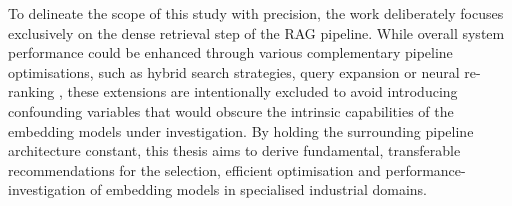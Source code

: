 To delineate the scope of this study with precision, the work deliberately focuses exclusively on the dense retrieval step of the \ac{RAG} pipeline. While overall system performance could be enhanced through various complementary pipeline optimisations, such as hybrid search strategies, query expansion or neural re-ranking \cite{gao_2024_rag}, these extensions are intentionally excluded to avoid introducing confounding variables that would obscure the intrinsic capabilities of the embedding models under investigation. By holding the surrounding pipeline architecture constant, this thesis aims to derive fundamental, transferable recommendations for the selection,  efficient optimisation and performance-investigation of embedding models in specialised industrial domains.